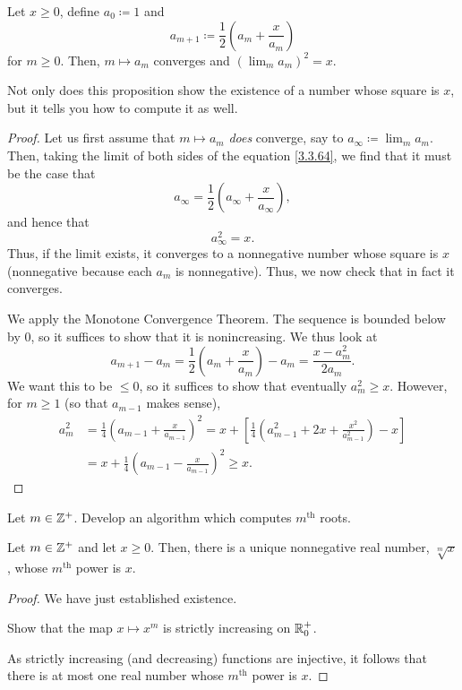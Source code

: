 \begin{prp}\label{prp3.3.59}
Let $x\geq 0$, define $a_0\coloneqq 1$ and
\begin{equation}\label{3.3.64}
a_{m+1}\coloneqq \frac{1}{2}\left( a_m+\frac{x}{a_m}\right)
\end{equation}
for $m\geq 0$.  Then, $m\mapsto a_m$ converges and $(\lim _ma_m)^2=x$.
\begin{rmk}
Not only does this proposition show the existence of a number whose square is $x$, but it tells you how to compute it as well.
\end{rmk}
\begin{proof}
Let us first assume that $m\mapsto a_m$ \emph{does} converge, say to $a_\infty \coloneqq \lim _ma_m$.  Then, taking the limit of both sides of the equation \eqref{3.3.64}, we find that it must be the case that
\begin{equation}
a_\infty =\frac{1}{2}\left( a_\infty +\frac{x}{a_\infty}\right) ,
\end{equation}
and hence that
\begin{equation}
a_\infty ^2=x.
\end{equation}
Thus, if the limit exists, it converges to a nonnegative number whose square is $x$ (nonnegative because each $a_m$ is nonnegative).  Thus, we now check that in fact it converges.

We apply the Monotone Convergence Theorem.  The sequence is bounded below by $0$, so it suffices to show that it is nonincreasing.  We thus look at
\begin{equation}
a_{m+1}-a_m=\frac{1}{2}\left( a_m+\frac{x}{a_m}\right) -a_m=\frac{x-a_m^2}{2a_m}.
\end{equation}
We want this to be $\leq 0$, so it suffices to show that eventually $a_m^2\geq x$.  However, for $m\geq 1$ (so that $a_{m-1}$ makes sense),
\begin{equation}
\begin{split}
a_m^2 & =\frac{1}{4}\left( a_{m-1}+\frac{x}{a_{m-1}}\right) ^2=x+\left[ \frac{1}{4}\left( a_{m-1}^2+2x+\frac{x^2}{a_{m-1}^2}\right) -x\right] \\
& =x+\frac{1}{4}\left( a_{m-1}-\frac{x}{a_{m-1}}\right) ^2\geq x.
\end{split}
\end{equation}
\end{proof}
\end{prp}
\begin{exr}
Let $m\in \mathbb{Z} ^+$.  Develop an algorithm which computes $m^{\text{th}}$ roots.
\end{exr}
\begin{prp}\label{prp3.3.66}
Let $m\in \mathbb{Z} ^+$ and let $x\geq 0$.  Then, there is a unique nonnegative real number, $\sqrt[m]{x}$, whose $m^{\text{th}}$ power is $x$.
\begin{proof}
We have just established existence.
\begin{exr}
Show that the map $x\mapsto x^m$ is strictly increasing on $\mathbb{R} _0^+$.
\end{exr}
As strictly increasing (and decreasing) functions are injective, it follows that there is at most one real number whose $m^{\text{th}}$ power is $x$.
\end{proof}
\end{prp}

